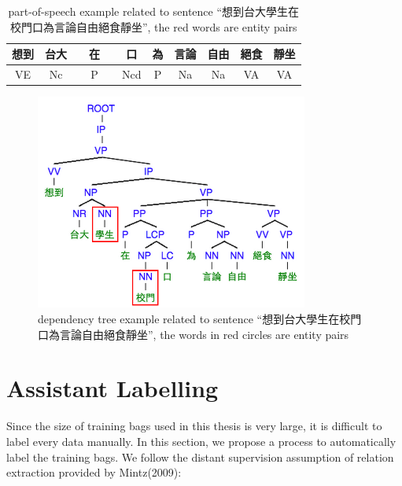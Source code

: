 \begin{table}
\begin{center}
\begin{tabular}{|ccccccccccc|}
\hline
想到 & 台大 & \textbf{\color{red}{學生}} & 在 & \textbf{\color{red}{校門}} & 口 & 為 & 言論 & 自由 & 絕食 & 靜坐\\
\hline
VE & Nc & \textbf{\color{red}{Na}} & P & \textbf{\color{red}{Na}} & Ncd & P & Na & Na & VA & VA\\
\hline
\end{tabular}
\captionsetup{width=0.8\textwidth}
\caption[part-of-speech example]{part-of-speech example related to sentence ``想到台大學生在校門口為言論自由絕食靜坐'', the red words are entity pairs}
\label{tab:pos_tag_example}
\end{center}
\end{table}

\begin{figure}
\centering
\includegraphics[width=0.8\textwidth]{dep_tree_example}
\captionsetup{width=0.8\textwidth}
\caption[dependency tree example]{dependency tree example related to sentence ``想到台大學生在校門口為言論自由絕食靜坐'', the words in red circles are entity pairs}
\label{fig:dep_tree_example}
\end{figure}


\section{Assistant Labelling}
\label{sec:method_label}

Since the size of training bags used in this thesis is very large, it is difficult to label every data manually.
In this section, we propose a process to automatically label the training bags.
We follow the distant supervision assumption of relation extraction provided by Mintz(2009)\cite{mintz_distant}:

